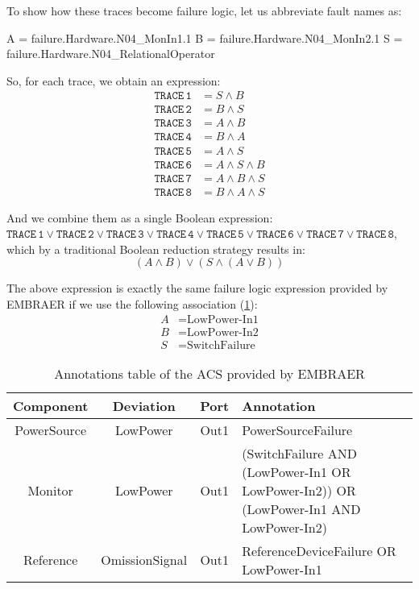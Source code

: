 \documentclass[en,twoside,onehalfspacing,phd]{risethesis}
\newcommand{\EMBRAER}{EMBRAER\xspace}
\newenvironment{snippetcspm}[1][2]
{
\ifthenelse{\equal{#1}{0}}
    {\tiny}
    {
    \ifthenelse{\equal{#1}{1}}
        {\scriptsize}
        {
        \ifthenelse{\equal{#1}{2}}
            {\footnotesize}
            {\small}
        }
    }
\verbatim
}
{
\endverbatim
}
\begin{document}
To show how these traces become failure logic, let us abbreviate fault names as:
%
\begin{snippetcspm}[2]
A = failure.Hardware.N04_MonIn1.1
B = failure.Hardware.N04_MonIn2.1
S = failure.Hardware.N04_RelationalOperator
\end{snippetcspm}
%
So, for each trace, we obtain an expression:
\begin{align*}
\mathtt{TRACE\,1} &= S \land B\\
\mathtt{TRACE\,2} &= B \land S\\
\mathtt{TRACE\,3} &= A \land B\\
\mathtt{TRACE\,4} &= B \land A\\
\mathtt{TRACE\,5} &= A \land S\\
\mathtt{TRACE\,6} &= A \land S \land B\\
\mathtt{TRACE\,7} &= A \land B \land S\\
\mathtt{TRACE\,8} &= B \land A \land S
\end{align*}

And we combine them as a single Boolean expression:
%
$\mathtt{TRACE\,1} \lor \mathtt{TRACE\,2} \lor \mathtt{TRACE\,3} \lor \mathtt{TRACE\,4} \lor \mathtt{TRACE\,5} \lor \mathtt{TRACE\,6} \lor \mathtt{TRACE\,7} \lor \mathtt{TRACE\,8}$, %
which by a traditional Boolean reduction strategy results in:
%
\[(A \land B) \lor (S \land (A \lor B))\]

\begin{sloppypar}
The above expression is exactly the same failure logic expression provided by \EMBRAER if we use the following association (\cref{tbl:acsAnnotations}):
\begin{align*}
A &= \text{LowPower-In1}\\
B &= \text{LowPower-In2}\\
S &= \text{SwitchFailure}
\end{align*}
\end{sloppypar}

\begin{table}[t]
\renewcommand{\arraystretch}{1.3}
\caption{Annotations table of the ACS provided by \EMBRAER}
\label{tbl:acsAnnotations}
\centering
\begin{tabularx}{\linewidth}{|c|c|c|X|}
\hline
\bfseries Component & \bfseries Deviation & \bfseries Port & \bfseries Annotation \\
\hline
PowerSource & LowPower & Out1 & PowerSourceFailure\\
\hline
Monitor & LowPower & Out1 & (SwitchFailure AND (LowPower-In1 OR LowPower-In2)) OR (LowPower-In1 AND LowPower-In2) \\
\hline
Reference & OmissionSignal & Out1 & ReferenceDeviceFailure OR LowPower-In1\\
\hline
\end{tabularx}
\end{table}
\end{document}
